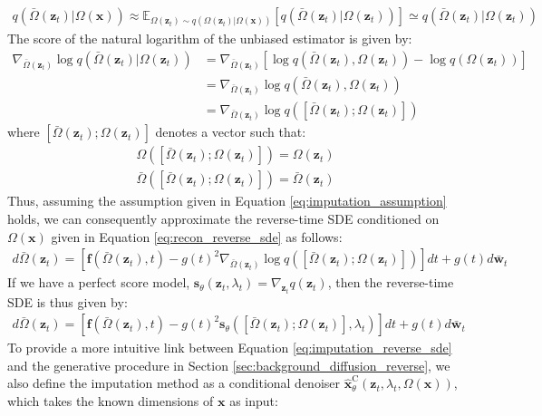 \documentclass[ oneside,%
                    author={George Herbert},
                    degree={MSci},
                     title={Diffusion Models for Time-Evolving Precipitation Fields},
                  subtitle={}]{dissertation}
\begin{document}
\begin{align}
      q(\bar\Omega(\mathbf{z}_t)|\Omega(\mathbf{x})) \approx \mathbb{E}_{\Omega(\mathbf{z}_t)\sim q(\Omega(\mathbf{z}_t)|\Omega(\mathbf{x}))}\left[q(\bar\Omega(\mathbf{z}_t)| \Omega(\mathbf{z}_t))\right] \simeq q(\bar\Omega(\mathbf{z}_t)| \Omega(\mathbf{z}_t))
\end{align}
The score of the natural logarithm of the unbiased estimator is given by:
\begin{align}
      \nabla_{\bar\Omega(\mathbf{z}_t)} \log q(\bar\Omega(\mathbf{z}_t)| \Omega(\mathbf{z}_t))&=\nabla_{\bar\Omega(\mathbf{z}_t)}\left[\log q(\bar\Omega(\mathbf{z}_t), \Omega(\mathbf{z}_t)) - \log q(\Omega(\mathbf{z}_t))\right]\\
      &=\nabla_{\bar\Omega(\mathbf{z}_t)} \log q(\bar\Omega(\mathbf{z}_t), \Omega(\mathbf{z}_t))\\
      &=\nabla_{\bar\Omega(\mathbf{z}_t)} \log q([\bar\Omega(\mathbf{z}_t); \Omega(\mathbf{z}_t)])
\end{align}
where $[\bar\Omega(\mathbf{z}_t); \Omega(\mathbf{z}_t)]$ denotes a vector such that:
\begin{align}
      \Omega([\bar\Omega(\mathbf{z}_t); \Omega(\mathbf{z}_t)]) = \Omega(\mathbf{z}_t)\\
      \bar\Omega([\bar\Omega(\mathbf{z}_t); \Omega(\mathbf{z}_t)]) = \bar\Omega(\mathbf{z}_t)
\end{align}
Thus, assuming the assumption given in Equation \ref{eq:imputation_assumption} holds, we can consequently approximate the reverse-time SDE conditioned on $\Omega(\mathbf{x})$ given in Equation \ref{eq:recon_reverse_sde} as follows:
\begin{align}
      d\bar\Omega(\mathbf{z}_t)=\left[\mathbf{f}(\bar\Omega(\mathbf{z}_t), t) - g(t)^2\nabla_{\bar\Omega(\mathbf{z}_t)}\log q([\bar\Omega(\mathbf{z}_t); \Omega(\mathbf{z}_t)])\right]dt + g(t)d \bar{\mathbf{w}}_t
\end{align}
If we have a perfect score model, $\mathbf{s}_\theta(\mathbf{z}_t, \lambda_t)=\nabla_{\mathbf{z}_t} q(\mathbf{z}_t)$, then the reverse-time SDE is thus given by:
\begin{align}
      d\bar\Omega(\mathbf{z}_t)=\left[\mathbf{f}(\bar\Omega(\mathbf{z}_t), t) - g(t)^2 \mathbf{s}_\theta([\bar\Omega(\mathbf{z}_t); \Omega(\mathbf{z}_t)], \lambda_t)\right]dt + g(t)d \bar{\mathbf{w}}_t\label{eq:imputation_reverse_sde}
\end{align}
To provide a more intuitive link between Equation \ref{eq:imputation_reverse_sde} and the generative procedure in Section \ref{sec:background_diffusion_reverse}, we also define the imputation method as a conditional denoiser $\hat{\mathbf{x}}^{\mathrm{C}}_\theta(\mathbf{z}_t, \lambda_t, \Omega(\mathbf{x}))$, which takes the known dimensions of $\mathbf{x}$ as input:
\end{document}
